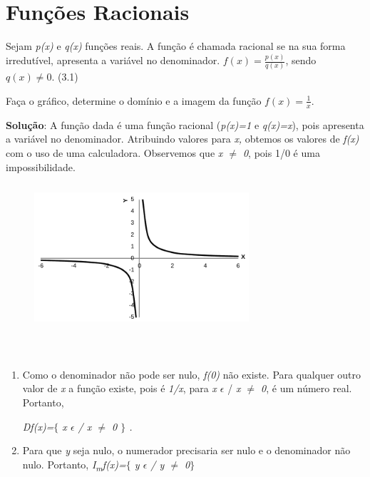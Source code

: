 \section{Funções Racionais}
 
\begin{caixa}
	\begin{tdefinicao}
		Sejam \textit{p(x)} e \textit{q(x)} funções reais. A função é chamada racional se na sua forma irredutível, apresenta a variável no denominador. 
		\( f \left( x \right) =\frac{p \left( x \right) }{q \left( x \right) } \), sendo \(  q \left( x \right)  \neq 0. \) \quad \quad \quad \quad \quad (3.1)
	\end{tdefinicao}
\end{caixa}
\begin{texemplo}

Faça o gráfico, determine o domínio e a imagem da função  \( f \left( x \right) =\frac{1}{x} \).

\textbf{Solução}: A função dada é uma função racional (\textit{p(x)=1} e \textit{q(x)=x}), pois apresenta a variável no denominador. Atribuindo valores para \textit{x,} obtemos os valores de \textit{f(x)} com o uso de uma calculadora. Observemos que \textit{x $ \neq $  0}, pois 1/0 é uma impossibilidade.

\begin{figure}[H]
	\begin{Center}
		\includegraphics[width=3.14in,height=2.14in]{capitulos/outras_funcoes/media/image10.pdf}
	\end{Center}
\end{figure}

~~

\begin{enumerate}[label=(\roman*)]
	\item Como o denominador não pode ser nulo, \textit{f(0)} não existe. Para qualquer outro valor de \textit{x} a função existe, pois é \textit{1/x}, para \textit{x $ \epsilon $  } / \textit{x $ \neq $  0}, é um número real. Portanto,  

\quad \quad \quad \textit{Df(x)=$ \{ $  x $ \epsilon $  \textbf{ }/ x $ \neq $  0\textbf{ }$ \} $ .}

	\item Para que \textit{y} seja nulo, o numerador precisaria ser nulo e o denominador não nulo. Portanto, \textit{I\textsubscript{m}f(x)=$ \{ $ y $ \epsilon $   / y $ \neq $  0$ \} $  }\qedsymbol{} 
\end{enumerate}

\end{texemplo}
